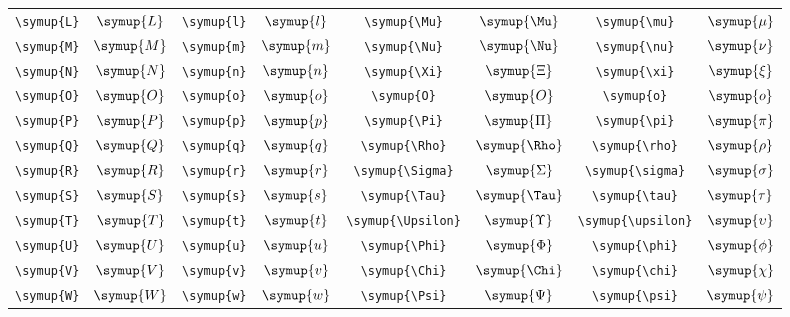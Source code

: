 \begin{longtable}{cccccccc}
    \verb|\symup{L}| & \(\symup{L}\) & \verb|\symup{l}| & \(\symup{l}\) & \verb|\symup{\Mu}|      & \(\symup{\Mu}\)      & \verb|\symup{\mu}|         & \(\symup{\mu}\)         \\
    \verb|\symup{M}| & \(\symup{M}\) & \verb|\symup{m}| & \(\symup{m}\) & \verb|\symup{\Nu}|      & \(\symup{\Nu}\)      & \verb|\symup{\nu}|         & \(\symup{\nu}\)         \\
    \verb|\symup{N}| & \(\symup{N}\) & \verb|\symup{n}| & \(\symup{n}\) & \verb|\symup{\Xi}|      & \(\symup{\Xi}\)      & \verb|\symup{\xi}|         & \(\symup{\xi}\)         \\
    \verb|\symup{O}| & \(\symup{O}\) & \verb|\symup{o}| & \(\symup{o}\) & \verb|\symup{O}|        & \(\symup{O}\)        & \verb|\symup{o}|           & \(\symup{o}\)           \\
    \verb|\symup{P}| & \(\symup{P}\) & \verb|\symup{p}| & \(\symup{p}\) & \verb|\symup{\Pi}|      & \(\symup{\Pi}\)      & \verb|\symup{\pi}|         & \(\symup{\pi}\)         \\
    \verb|\symup{Q}| & \(\symup{Q}\) & \verb|\symup{q}| & \(\symup{q}\) & \verb|\symup{\Rho}|     & \(\symup{\Rho}\)     & \verb|\symup{\rho}|        & \(\symup{\rho}\)        \\
    \verb|\symup{R}| & \(\symup{R}\) & \verb|\symup{r}| & \(\symup{r}\) & \verb|\symup{\Sigma}|   & \(\symup{\Sigma}\)   & \verb|\symup{\sigma}|      & \(\symup{\sigma}\)      \\
    \verb|\symup{S}| & \(\symup{S}\) & \verb|\symup{s}| & \(\symup{s}\) & \verb|\symup{\Tau}|     & \(\symup{\Tau}\)     & \verb|\symup{\tau}|        & \(\symup{\tau}\)        \\
    \verb|\symup{T}| & \(\symup{T}\) & \verb|\symup{t}| & \(\symup{t}\) & \verb|\symup{\Upsilon}| & \(\symup{\Upsilon}\) & \verb|\symup{\upsilon}|    & \(\symup{\upsilon}\)    \\
    \verb|\symup{U}| & \(\symup{U}\) & \verb|\symup{u}| & \(\symup{u}\) & \verb|\symup{\Phi}|     & \(\symup{\Phi}\)     & \verb|\symup{\phi}|        & \(\symup{\phi}\)        \\
    \verb|\symup{V}| & \(\symup{V}\) & \verb|\symup{v}| & \(\symup{v}\) & \verb|\symup{\Chi}|     & \(\symup{\Chi}\)     & \verb|\symup{\chi}|        & \(\symup{\chi}\)        \\
    \verb|\symup{W}| & \(\symup{W}\) & \verb|\symup{w}| & \(\symup{w}\) & \verb|\symup{\Psi}|     & \(\symup{\Psi}\)     & \verb|\symup{\psi}|        & \(\symup{\psi}\)        \\

\end{longtable}
